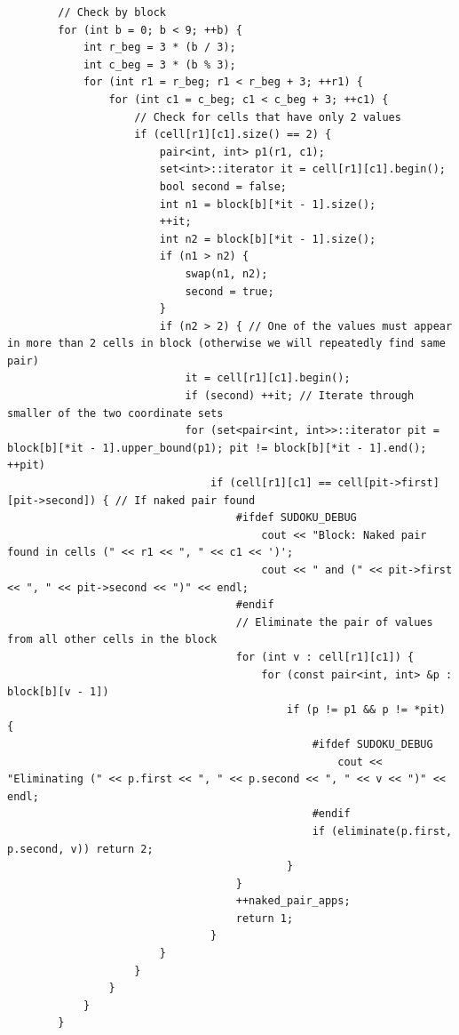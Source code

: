 \documentclass{article}
\begin{document}
\begin{lstlisting}
        // Check by block
        for (int b = 0; b < 9; ++b) {
            int r_beg = 3 * (b / 3);
            int c_beg = 3 * (b % 3);
            for (int r1 = r_beg; r1 < r_beg + 3; ++r1) {
                for (int c1 = c_beg; c1 < c_beg + 3; ++c1) {
                    // Check for cells that have only 2 values
                    if (cell[r1][c1].size() == 2) {
                        pair<int, int> p1(r1, c1);
                        set<int>::iterator it = cell[r1][c1].begin();
                        bool second = false;
                        int n1 = block[b][*it - 1].size();
                        ++it;
                        int n2 = block[b][*it - 1].size();
                        if (n1 > n2) {
                            swap(n1, n2);
                            second = true;
                        }
                        if (n2 > 2) { // One of the values must appear in more than 2 cells in block (otherwise we will repeatedly find same pair)
                            it = cell[r1][c1].begin();
                            if (second) ++it; // Iterate through smaller of the two coordinate sets
                            for (set<pair<int, int>>::iterator pit = block[b][*it - 1].upper_bound(p1); pit != block[b][*it - 1].end(); ++pit)
                                if (cell[r1][c1] == cell[pit->first][pit->second]) { // If naked pair found
                                    #ifdef SUDOKU_DEBUG
                                        cout << "Block: Naked pair found in cells (" << r1 << ", " << c1 << ')';
                                        cout << " and (" << pit->first << ", " << pit->second << ")" << endl;
                                    #endif
                                    // Eliminate the pair of values from all other cells in the block
                                    for (int v : cell[r1][c1]) {
                                        for (const pair<int, int> &p : block[b][v - 1])
                                            if (p != p1 && p != *pit) {
                                                #ifdef SUDOKU_DEBUG
                                                    cout << "Eliminating (" << p.first << ", " << p.second << ", " << v << ")" << endl;
                                                #endif
                                                if (eliminate(p.first, p.second, v)) return 2;
                                            }
                                    }
                                    ++naked_pair_apps;
                                    return 1;
                                }
                        }
                    }
                }
            }
        }


\end{lstlisting}
\end{document}
